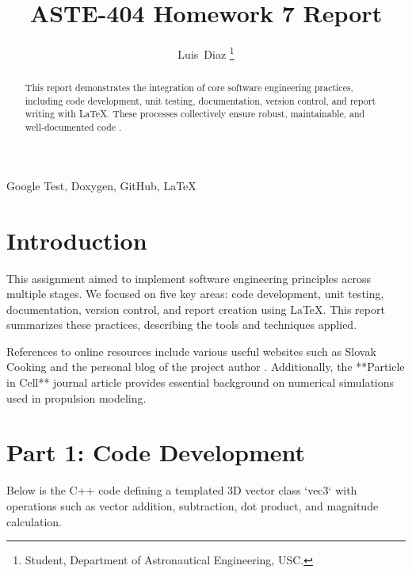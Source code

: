 \documentclass[
]{IEEEtran}
\begin{document}
\title{ASTE-404 Homework 7 Report}
\author{Luis~Diaz
\thanks{Student, Department of Astronautical Engineering, USC.}}
\maketitle
{}

\begin{abstract}
This report demonstrates the integration of core software engineering practices, including code development, unit testing, documentation, version control, and report writing with \LaTeX. These processes collectively ensure robust, maintainable, and well-documented code \cite{particleincell}.
\end{abstract}

\begin{IEEEkeywords}
Google Test, Doxygen, GitHub, \LaTeX
\end{IEEEkeywords}

\section{Introduction}
This assignment aimed to implement software engineering principles across multiple stages. We focused on five key areas: code development, unit testing, documentation, version control, and report creation using \LaTeX. This report summarizes these practices, describing the tools and techniques applied.

References to online resources include various useful websites such as Slovak Cooking \cite{slovakcooking} and the personal blog of the project author \cite{iamlubos}. Additionally, the **Particle in Cell** journal article \cite{brieda2026} provides essential background on numerical simulations used in propulsion modeling.

\section{Part 1: Code Development}
Below is the C++ code defining a templated 3D vector class `vec3` with operations such as vector addition, subtraction, dot product, and magnitude calculation.
\end{document}
